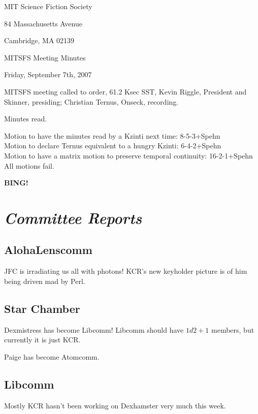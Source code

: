 \documentclass[10pt]{article}
\newcommand{\bing}{{\bf BING!} }
\newcommand{\goto}[1]{\bing \vskip 12pt \section*{{\em{#1}}}}
\begin{document}
\begin{center}

MIT Science Fiction Society

84 Massachusetts Avenue

Cambridge, MA 02139

\vspace{12pt}

MITSFS Meeting Minutes

Friday, September 7th, 2007

\end{center}

\vspace{18pt}

\setlength{\parskip}{6pt}

\noindent
MITSFS meeting called to order, 61.2 Ksec SST,
Kevin Riggle, President and Skinner, presiding; Christian Ternus, Onseck, recording.

Minutes read.

Motion to have the minutes read by a Kzinti next time: 8-5-3+Spehn\\
Motion to declare Ternus equivalent to a hungry Kzinti: 6-4-2+Spehn\\
Motion to have a matrix motion to preserve temporal continuity: 16-2-1+Spehn\\

All motions fail.

\goto{Committee Reports}

\subsection*{AlohaLenscomm}

JFC is irradiating us all with photons!  KCR's new keyholder picture is of him being driven mad by Perl.

\subsection*{Star Chamber}

Dexmistress has become Libcomm!  Libcomm should have $1d2+1$ members, but currently it is just KCR. 

Paige has become Atomcomm.

\subsection*{Libcomm}

Mostly KCR hasn't been working on Dexhamster very much this week.
\end{document}
